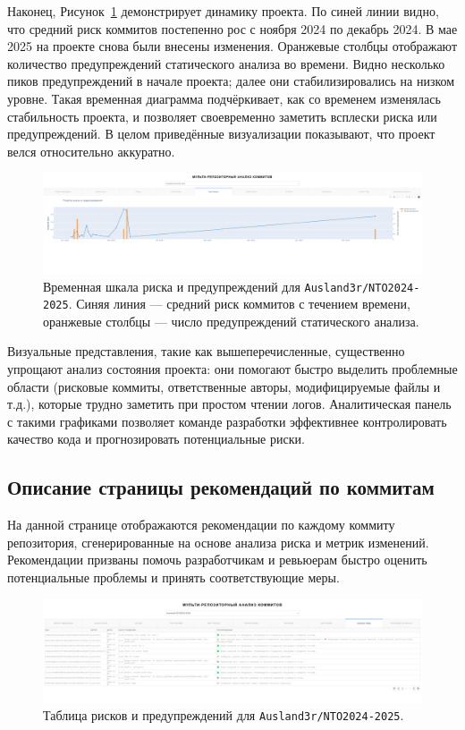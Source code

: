Наконец, Рисунок~\ref{fig:timeline} демонстрирует динамику проекта. По синей линии видно, что средний риск коммитов постепенно рос с ноября 2024 по декабрь 2024. В мае 2025 на проекте снова были внесены изменения. Оранжевые столбцы отображают количество предупреждений статического анализа во времени. Видно несколько пиков предупреждений в начале проекта; далее они стабилизировались на низком уровне. Такая временная диаграмма подчёркивает, как со временем изменялась стабильность проекта, и позволяет своевременно заметить всплески риска или предупреждений. В целом приведённые визуализации показывают, что проект велся относительно аккуратно. 



\begin{figure}[ht]
	\centering
	\includegraphics[width=\textwidth]{my_folder/images/fifth_page.png}
	\caption{Временная шкала риска и предупреждений для \texttt{Ausland3r/NTO2024-2025}. Синяя линия — средний риск коммитов с течением времени, оранжевые столбцы — число предупреждений статического анализа.}
	\label{fig:timeline}
\end{figure}

Визуальные представления, такие как вышеперечисленные, существенно упрощают анализ состояния проекта: они помогают быстро выделить проблемные области (рисковые коммиты, ответственные авторы, модифицируемые файлы и т.д.), которые трудно заметить при простом чтении логов. Аналитическая панель с такими графиками позволяет команде разработки эффективнее контролировать качество кода и прогнозировать потенциальные риски. 

\subsection{Описание страницы рекомендаций по коммитам}

На данной странице отображаются рекомендации по каждому коммиту репозитория, сгенерированные на основе анализа риска и метрик изменений. Рекомендации призваны помочь разработчикам и ревьюерам быстро оценить потенциальные проблемы и принять соответствующие меры.

\begin{figure}[ht]
	\centering
	\includegraphics[width=\textwidth]{my_folder/images/capa_page.png}
	\caption{Таблица рисков и предупреждений для \texttt{Ausland3r/NTO2024-2025}.}
	\label{fig:timeline123}
\end{figure}


